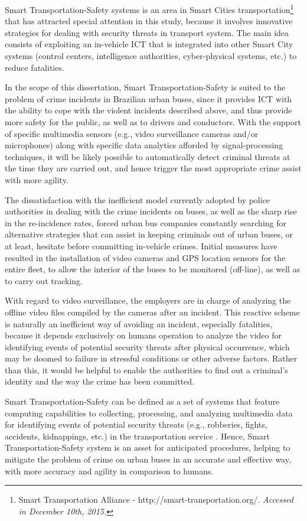 Smart Transportation-Safety systems is an area in Smart Cities transportation\footnote[5]{Smart Transportation Alliance - http://smart-transportation.org/. \textit{Accessed in December 10th, 2015.}} that has attracted special attention in this study, because it involves innovative strategies for dealing with security threats in transport system. The main idea consists of exploiting an in-vehicle ICT that is integrated into other Smart City systems (control centers, intelligence authorities, cyber-physical systems, etc.) to reduce fatalities. 

In the scope of this dissertation, Smart Transportation-Safety is suited to the problem of crime incidents in Brazilian urban buses, since it provides ICT with the ability to cope with the violent incidents described above, and thus provide more safety for the public, as well as to drivers and conductors. With the support of specific multimedia sensors (e.g., video surveillance cameras and/or microphones) along with specific data analytics afforded by signal-processing techniques, it will be likely possible to automatically detect criminal threats at the time they are carried out, and hence trigger the most appropriate crime assist with more agility.

The dissatisfaction with the inefficient model currently adopted by police authorities in dealing with the crime incidents on buses, as well as the sharp rise in the re-incidence rates, forced urban bus companies constantly searching for alternative strategies that can assist in keeping criminals out of urban buses, or at least, hesitate before committing in-vehicle crimes. Initial measures have resulted in the installation of video cameras and GPS location sensors for the entire fleet, to allow the interior of the buses to be monitored (off-line), as well as to carry out tracking. 

With regard to video surveillance, the employers are in charge of analyzing the offline video files compiled by the cameras after an incident. This reactive scheme is naturally an inefficient way of avoiding an incident, especially fatalities, because it depends exclusively on humans operation to analyze the video for identifying events of potential security threats after physical occurrence, which may be doomed to failure in stressful conditions or other adverse factors. Rather than this, it would be helpful to enable the authorities to find out a criminal's identity and the way the crime has been committed.

Smart Transportation-Safety can be defined as a set of systems that feature computing capabilities to collecting, processing, and analyzing multimedia data for identifying events of potential security threats (e.g., robberies, fights, accidents, kidnappings, etc.) in the transportation service \cite{Anwar_Hossain}. Hence, Smart Transportation-Safety system is an asset for anticipated procedures, helping to mitigate the problem of crime on urban buses in an accurate and effective way, with more accuracy and agility in comparison to humans.

